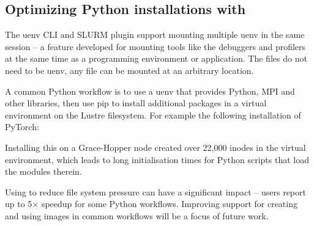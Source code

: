 \subsection{Optimizing Python installations with \squashfs}
\label{sec:usecase-squashfs}

The uenv CLI and SLURM plugin support mounting multiple uenv in the same session -- a feature developed for mounting tools like the debuggers and profilers at the same time as a programming environment or application.
The \squashfs files do not need to be uenv, any \squashfs file can be mounted at an arbitrary location.

A common Python workflow is to use a uenv that provides Python, MPI and other libraries, then use pip to install additional packages in a virtual environment on the Lustre filesystem.
For example the following installation of PyTorch:

Installing this on a Grace-Hopper node created over 22,000 inodes in the virtual environment, which leads to long initialisation times for Python scripts that load the modules therein.


Using \squashfs to reduce file system pressure can have a significant impact -- users report up to 5$\times$ speedup for some Python workflows.
Improving support for creating and using \squashfs images in common workflows will be a focus of future work.

